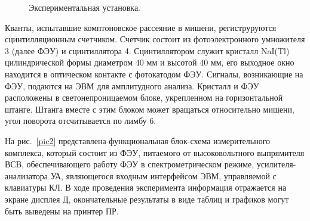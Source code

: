\documentclass[a4paper, 12pt]{article}%
\begin{document}
	
	\begin{figure}[h!]
		{\caption{Экспериментальная установка.}}
	\end{figure}
	
	Кванты, испытавшие комптоновское рассеяние в мишени, региструруются сцинтилляционным счетчиком. Счетчик состоит из фотоэлектронного умножителя 3 (далее ФЭУ) и сцинтиллятора 4. Сцинтиллятором служит кристалл NaI(Tl) цилиндрической формы диаметром 40 мм и высотой 40 мм, его выходное окно находится в оптическом контакте с фотокатодом ФЭУ. Сигналы, возникающие на ФЭУ, подаются на ЭВМ для амплитудного анализа. Кристалл и ФЭУ расположены в светонепроницаемом блоке, укрепленном на горизонтальной штанге. Штанга вместе с этим блоком может вращаться относительно мишени, угол поворота отсчитывается по лимбу 6.
	
	На рис.~\ref{pic2} представлена функциональная блок-схема измерительного комплекса, который состоит из ФЭУ, питаемого от высоковольтного выпрямителя ВСВ, обеспечивающего работу ФЭУ в спектрометрическом режиме, усилителя-анализатора УА, являющегося входным интерфейсом ЭВМ, управляемой с клавиатуры КЛ. В ходе проведения эксперимента информация отражается на экране дисплея Д, окончательные результаты в виде таблиц и графиков могут быть выведены на принтер ПР.
\end{document}
